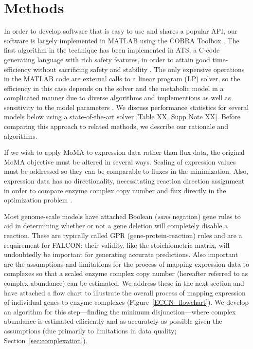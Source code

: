 \section{Methods}

In order to develop software that is easy to use and shares a popular API,
our software is largely implemented in MATLAB using the COBRA
Toolbox \citep{Hyduke2011}. The first algorithm in the technique
has been implemented in ATS, a C-code generating language with rich
safety features, in order to attain good time-efficiency without sacrificing
safety and stability \citep{ATStypes03}. The only expensive operations in the
MATLAB code are external calls to a linear program (LP) solver,
so the efficiency in this case depends on the solver and the metabolic
model in a complicated manner due to diverse algorithms and
implementions as well as sensitivity to the model parameters
\citep{Mittelmann2013,Todd2002}. We discuss performance statistics for
several models below using a state-of-the-art solver \ref{Table XX,
  Supp Note XX}. Before comparing this approach to related methods, we
describe our rationale and algorithms.

If we wish to apply MoMA to expression data rather than flux data, the
original MoMA objective must be altered in several ways. Scaling of
expression values must be addressed so they can be comparable to
fluxes in the minimization. Also, expression data has no
directionality, necessitating reaction direction assignment in order
to compare enzyme complex copy number and flux directly in the
optimization problem \citep{Lee2012}.

Most genome-scale models have attached Boolean (\textit{sans}
negation) gene rules to aid in determining whether or not a gene
deletion will
completely disable a reaction. These are typically called GPR
(gene-protein-reaction) rules and are a requirement for FALCON; their
validity, like the stoichiometric matrix, will undoubtedly be
important for generating accurate predictions. Also important are the
assumptions and limitations for the process of mapping expression data
to complexes so that a scaled enzyme complex copy number (hereafter
referred to as complex abundance) can be estimated. We address these
in the next section and have attached a flow chart to illustrate the
overall process of mapping expression of individual genes to enzyme
complexes (Figure~\ref{ECCN_flowchart}). We develop an algorithm for
this step---finding the minimum disjunction---where complex abundance
is estimated efficiently and as accurately as possible given the
assumptions (due primarily to limitations in data quality; \suppOrApp
Section~\ref{sec:complexation}).

